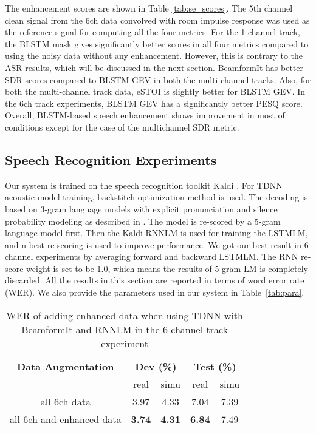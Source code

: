 \documentclass[a4paper]{article}
\begin{document}
The enhancement scores are shown in Table \ref{tab:se_scores}. 
The 5th channel clean signal from the 6ch data convolved with room impulse response was used as the reference signal for computing all the four metrics. 
For the 1 channel track, the BLSTM mask gives significantly better scores in all four metrics compared to using the noisy data without any enhancement.
However, this is contrary to the ASR results, which will be discussed in the next section. 
BeamformIt has better SDR scores compared to BLSTM GEV in both the multi-channel tracks. 
Also, for both the multi-channel track data, eSTOI is slightly better for BLSTM GEV. 
In the 6ch track experiments, BLSTM GEV has a significantly better PESQ score.
Overall, BLSTM-based speech enhancement shows improvement in most of conditions except for the case of the multichannel SDR metric.

\subsection{Speech Recognition Experiments}
\label{sec:exp}
Our system is trained on the speech recognition toolkit Kaldi \cite{povey2011kaldi}. For TDNN acoustic model training, backstitch optimization method \cite{Wang2017} is used. The decoding is based on 3-gram language models with explicit pronunciation and silence probability modeling as described in \cite{chen2015pronunciation}. The model is re-scored by a 5-gram language model first. Then the Kaldi-RNNLM \cite{xuneural} is used for training the LSTMLM, and n-best re-scoring is used to improve performance. We got our best result in 6 channel experiments by averaging forward and backward LSTMLM. The RNN re-score weight is set to be 1.0, which means the results of 5-gram LM is completely discarded. All the results in this section are reported in terms of word error rate (WER). We also provide the parameters used in our system in Table~\ref{tab:para}.

\begin{table}[h]
  \caption{WER of adding enhanced data when using TDNN with BeamformIt and RNNLM in the 6 channel track experiment}
  \label{tab:enhan}
  \centering
  \begin{tabular}{ c c c c c }
    \toprule
    \textbf{Data Augmentation} & \multicolumn{2}{c}{\textbf{Dev (\%)}} & \multicolumn{2}{c}{\textbf{Test (\%)}} \\
	& real & simu & real & simu \\
   	\midrule
    all 6ch data & 3.97 & 4.33 & 7.04 & 7.39 \\
    all 6ch and enhanced data & \textbf{3.74} & \textbf{4.31} & \textbf{6.84} & 7.49 \\
    
    \bottomrule
  \end{tabular}
\end{table}
\end{document}
